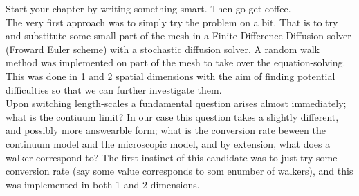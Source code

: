 Start your chapter by writing something smart. Then go get coffee.\\
The very first approach was to simply try the problem on a bit. That is to try and substitute some small part of the mesh in a Finite Difference Diffusion solver (Froward Euler scheme) with a stochastic diffusion solver. A random walk method was implemented on part of the mesh to take over the equation-solving. This was done in 1 and 2 spatial dimensions with the aim of finding potential difficulties so that we can further investigate them. \\
Upon switching length-scales a fundamental question arises almost immediately; what is the contiuum limit? In our case this question takes a slightly different, and possibly more answearble form; what is the conversion rate beween the continuum model and the microscopic model, and by extension, what does a walker correspond to?
The first instinct of this candidate was to just try some conversion rate (say some value corresponds to som enumber of walkers), and this was implemented in both 1 and 2 dimensions.